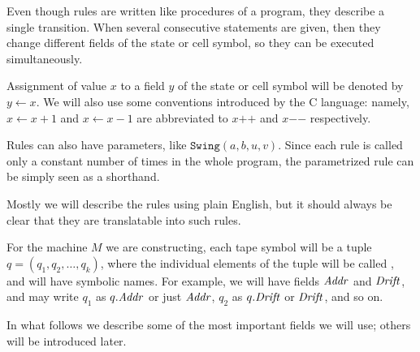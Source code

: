 \documentclass[11pt]{memoir}
\theoremstyle{definition} %
\newcommand{\fld}[1]{\ensuremath{\textit{#1\/}}}
\newcommand{\rul}[1]{\ensuremath{\texttt{#1}}}
\newcommand{\Addr}{\fld{Addr}}
\newcommand{\Drift}{\fld{Drift}}
\newcommand{\increment}[1]{#1\mathord{+}\mathord{+}}
\newcommand{\decrement}[1]{#1\mathord{-}\mathord{-}}
\newcommand{\ruSwing}{\rul{Swing}}
\begin{document}
Even though rules are written like procedures of a program,
they describe a single transition.
When several consecutive statements are given, then they
change different fields of the state or
cell symbol, so they can be executed simultaneously.

Assignment of value \( x \) to a field \( y \) of the state or cell symbol will
be denoted by \( y \gets x \).
We will also use some conventions introduced by the C language:
namely,
\( x\gets x+1 \) and \( x\gets x-1 \) are abbreviated to \( \increment{x} \) and
\( \decrement{x} \) respectively.

Rules can also have parameters, like \( \ruSwing(a,b,u,v) \).
Since each rule is called only a constant number of times in the whole program,
the parametrized rule can be simply seen as a shorthand.

Mostly we will describe
the rules using plain English, but it should always be clear that they
are translatable into such rules.



\begin{sloppypar}
For the machine \( M \) we are constructing, each tape symbol will 
be a tuple \( q=(q_{1},q_{2},\dots,q_{k}) \),
where the individual elements of the tuple will be called , and will
have symbolic names.
For example, we will have fields \( \Addr \) and \( \Drift \),
and may write \( q_{1} \) as \( q.\Addr \) or just \( \Addr \), 
\( q_{2} \) as \( q.\Drift \) or \( \Drift \), and so on.
\end{sloppypar}

In what follows we describe some of the most important fields we will use;
others will be introduced later.
\end{document}
